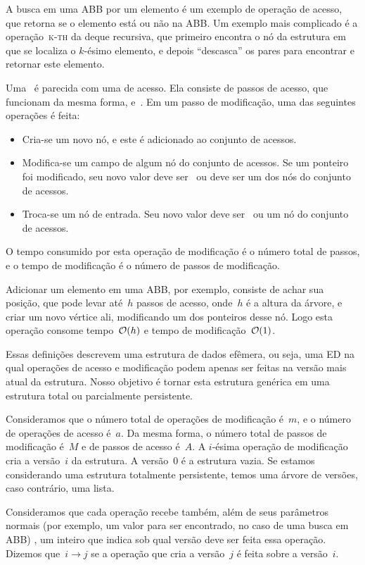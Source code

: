 \documentclass[main.tex]{subfiles}
\begin{document}
A busca em uma ABB por um elemento é um exemplo de operação de acesso, que retorna se o elemento está ou não na ABB. Um exemplo mais complicado é a operação~\textsc{k-th} da deque recursiva, que primeiro encontra o nó da estrutura em que se localiza o $k$-ésimo elemento, e depois ``descasca'' os pares para encontrar e retornar este elemento.

Uma~ é parecida com uma de acesso. Ela consiste de passos de acesso, que funcionam da mesma forma, e~. Em um passo de modificação, uma das seguintes operações é feita:
\begin{itemize}
	\item Cria-se um novo nó, e este é adicionado ao conjunto de acessos.
	\item Modifica-se um campo de algum nó do conjunto de acessos. Se um ponteiro foi modificado, seu novo valor deve ser~ ou deve ser um dos nós do conjunto de acessos.
	\item Troca-se um nó de entrada. Seu novo valor deve ser~ ou um nó do conjunto de acessos.
\end{itemize}

O tempo consumido por esta operação de modificação é o número total de passos, e o tempo de modificação é o número de passos de modificação.

Adicionar um elemento em uma ABB, por exemplo, consiste de achar sua posição, que pode levar até~$h$ passos de acesso, onde~$h$ é a altura da árvore, e criar um novo vértice ali, modificando um dos ponteiros desse nó. Logo esta operação consome tempo~$\mathcal{O}(h)$ e tempo de modificação~$\mathcal{O}(1)$.

Essas definições descrevem uma estrutura de dados efêmera, ou seja, uma ED na qual operações de acesso e modificação podem apenas ser feitas na versão mais atual da estrutura. Nosso objetivo é tornar esta estrutura genérica em uma estrutura total ou parcialmente persistente.

Consideramos que o número total de operações de modificação é~$m$, e o número de operações de acesso é~$a$. Da mesma forma, o número total de passos de modificação é~$M$ e de passos de acesso é~$A$. A $i$-ésima operação de modificação cria a versão~$i$ da estrutura. A versão~0 é a estrutura vazia. Se estamos considerando uma estrutura totalmente persistente, temos uma árvore de versões, caso contrário, uma lista.

Consideramos que cada operação recebe também, além de seus parâmetros normais (por exemplo, um valor para ser encontrado, no caso de uma busca em ABB) , um inteiro que indica sob qual versão deve ser feita essa operação. Dizemos que~$i \rightarrow j$ se a operação que cria a versão~$j$ é feita sobre a versão~$i$.
\end{document}
